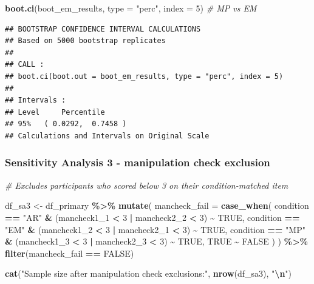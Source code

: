 \documentclass[
]{article}
\newenvironment{Shaded}{\begin{snugshade}}{\end{snugshade}}
\newcommand{\AttributeTok}[1]{\textcolor[rgb]{0.13,0.29,0.53}{#1}}
\newcommand{\CommentTok}[1]{\textcolor[rgb]{0.56,0.35,0.01}{\textit{#1}}}
\newcommand{\ConstantTok}[1]{\textcolor[rgb]{0.56,0.35,0.01}{#1}}
\newcommand{\DecValTok}[1]{\textcolor[rgb]{0.00,0.00,0.81}{#1}}
\newcommand{\FunctionTok}[1]{\textcolor[rgb]{0.13,0.29,0.53}{\textbf{#1}}}
\newcommand{\NormalTok}[1]{#1}
\newcommand{\OtherTok}[1]{\textcolor[rgb]{0.56,0.35,0.01}{#1}}
\newcommand{\SpecialCharTok}[1]{\textcolor[rgb]{0.81,0.36,0.00}{\textbf{#1}}}
\newcommand{\StringTok}[1]{\textcolor[rgb]{0.31,0.60,0.02}{#1}}
\begin{document}
\begin{Shaded}
\begin{Highlighting}[]
\FunctionTok{boot.ci}\NormalTok{(boot\_em\_results, }\AttributeTok{type =} \StringTok{"perc"}\NormalTok{, }\AttributeTok{index =} \DecValTok{5}\NormalTok{) }\CommentTok{\# MP vs EM}
\end{Highlighting}
\end{Shaded}

\begin{verbatim}
## BOOTSTRAP CONFIDENCE INTERVAL CALCULATIONS
## Based on 5000 bootstrap replicates
## 
## CALL : 
## boot.ci(boot.out = boot_em_results, type = "perc", index = 5)
## 
## Intervals : 
## Level     Percentile     
## 95%   ( 0.0292,  0.7458 )  
## Calculations and Intervals on Original Scale
\end{verbatim}

\subsubsection{Sensitivity Analysis 3 - manipulation check
exclusion}\label{sensitivity-analysis-3---manipulation-check-exclusion}

\begin{Shaded}
\begin{Highlighting}[]
\CommentTok{\# Excludes participants who scored below 3 on their condition{-}matched item}

\NormalTok{df\_sa3 }\OtherTok{\textless{}{-}}\NormalTok{ df\_primary }\SpecialCharTok{\%\textgreater{}\%}
  \FunctionTok{mutate}\NormalTok{(}
    \AttributeTok{mancheck\_fail =} \FunctionTok{case\_when}\NormalTok{(}
\NormalTok{      condition }\SpecialCharTok{==} \StringTok{"AR"} \SpecialCharTok{\&}\NormalTok{ (mancheck1\_1 }\SpecialCharTok{\textless{}} \DecValTok{3} \SpecialCharTok{|}\NormalTok{ mancheck2\_2 }\SpecialCharTok{\textless{}} \DecValTok{3}\NormalTok{) }\SpecialCharTok{\textasciitilde{}} \ConstantTok{TRUE}\NormalTok{,}
\NormalTok{      condition }\SpecialCharTok{==} \StringTok{"EM"} \SpecialCharTok{\&}\NormalTok{ (mancheck1\_2 }\SpecialCharTok{\textless{}} \DecValTok{3} \SpecialCharTok{|}\NormalTok{ mancheck2\_1 }\SpecialCharTok{\textless{}} \DecValTok{3}\NormalTok{) }\SpecialCharTok{\textasciitilde{}} \ConstantTok{TRUE}\NormalTok{,}
\NormalTok{      condition }\SpecialCharTok{==} \StringTok{"MP"} \SpecialCharTok{\&}\NormalTok{ (mancheck1\_3 }\SpecialCharTok{\textless{}} \DecValTok{3} \SpecialCharTok{|}\NormalTok{ mancheck2\_3 }\SpecialCharTok{\textless{}} \DecValTok{3}\NormalTok{) }\SpecialCharTok{\textasciitilde{}} \ConstantTok{TRUE}\NormalTok{,}
      \ConstantTok{TRUE} \SpecialCharTok{\textasciitilde{}} \ConstantTok{FALSE}
\NormalTok{    )}
\NormalTok{  ) }\SpecialCharTok{\%\textgreater{}\%}
  \FunctionTok{filter}\NormalTok{(mancheck\_fail }\SpecialCharTok{==} \ConstantTok{FALSE}\NormalTok{)}

\FunctionTok{cat}\NormalTok{(}\StringTok{"Sample size after manipulation check exclusions:"}\NormalTok{, }\FunctionTok{nrow}\NormalTok{(df\_sa3), }\StringTok{"}\SpecialCharTok{\textbackslash{}n}\StringTok{"}\NormalTok{)}
\end{Highlighting}
\end{Shaded}
\end{document}
